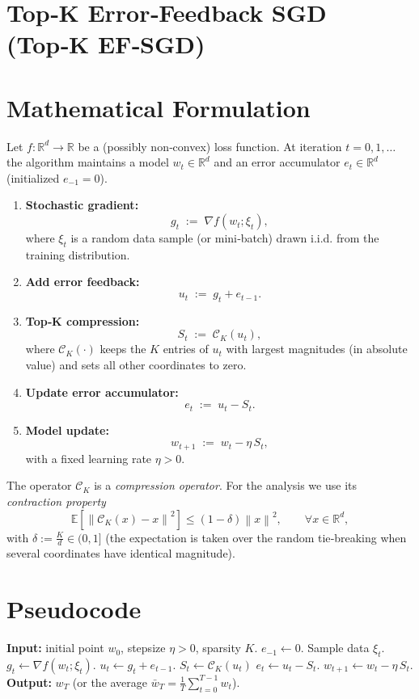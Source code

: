 \documentclass{article}
\newcommand{\R}{\mathbb{R}}
\newcommand{\norm}[1]{\left\lVert#1\right\rVert}
\begin{document}
\section*{Top‑K Error‑Feedback SGD (Top‑K EF‑SGD)}

\section*{Mathematical Formulation}
Let $f:\R^{d}\rightarrow\R$ be a (possibly non‑convex) loss function.  
At iteration $t=0,1,\dots$ the algorithm maintains a model $w_t\in\R^{d}$ and an
error accumulator $e_t\in\R^{d}$ (initialized $e_{-1}=0$).  

\begin{enumerate}[label=\textbf{Step \arabic*:},leftmargin=*]
\item \textbf{Stochastic gradient:}
\[
g_t \;:=\; \nabla f(w_t;\xi_t),
\]
where $\xi_t$ is a random data sample (or mini‑batch) drawn i.i.d. from the
training distribution.
\item \textbf{Add error feedback:}
\[
u_t \;:=\; g_t + e_{t-1}.
\]
\item \textbf{Top‑K compression:}
\[
S_t \;:=\; \mathcal{C}_{K}(u_t),
\]
where $\mathcal{C}_{K}(\cdot)$ keeps the $K$ entries of $u_t$ with largest
magnitudes (in absolute value) and sets all other coordinates to zero.
\item \textbf{Update error accumulator:}
\[
e_t \;:=\; u_t - S_t .
\]
\item \textbf{Model update:}
\[
w_{t+1} \;:=\; w_t - \eta\, S_t ,
\]
with a fixed learning rate $\eta>0$.
\end{enumerate}

The operator $\mathcal{C}_{K}$ is a \emph{compression operator}.  For the
analysis we use its \emph{contraction property}
\begin{equation}
\label{eq:contraction}
\mathbb{E}\!\left[\norm{\mathcal{C}_{K}(x)-x}^{2}\right]\le (1-\delta)\norm{x}^{2},
\qquad\forall x\in\R^{d},
\end{equation}
with $\delta:=\frac{K}{d}\in(0,1]$ (the expectation is taken over the random tie‑breaking
when several coordinates have identical magnitude).

\section*{Pseudocode}
\begin{algorithm}[H]
\caption{Top‑K EF‑SGD}
\begin{algorithmic}[1]
\STATE \textbf{Input:} initial point $w_0$, stepsize $\eta>0$, sparsity $K$.
\STATE $e_{-1}\gets 0$.
    \STATE Sample data $\xi_t$.
    \STATE $g_t \gets \nabla f(w_t;\xi_t)$.
    \STATE $u_t \gets g_t + e_{t-1}$.
    \STATE $S_t \gets \mathcal{C}_{K}(u_t)$ \hfill{}
    \STATE $e_t \gets u_t - S_t$.
    \STATE $w_{t+1} \gets w_t - \eta\, S_t$.
\ENDFOR
\STATE \textbf{Output:} $w_T$ (or the average $\bar w_T=\frac1T\sum_{t=0}^{T-1}w_t$).
\end{algorithmic}
\end{algorithm}
\end{document}
